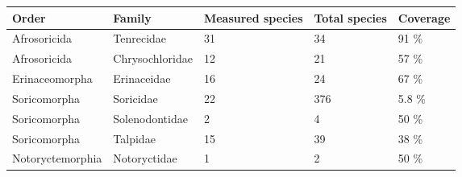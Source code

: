 

\begin{tabular}{p{3.3cm}p{3.3cm}p{2cm}p{2cm}p{2cm}}

\hline
\textbf{Order} & \textbf{Family} & \textbf{Measured species} & \textbf{Total species} & \textbf{Coverage} \\
\hline
Afrosoricida & Tenrecidae & 31 & 34 & 91 \% \\
Afrosoricida & Chrysochloridae & 12 & 21 & 57 \% \\
Erinaceomorpha & Erinaceidae & 16 & 24 & 67 \% \\
Soricomorpha & Soricidae & 22 & 376 & 5.8 \% \\
Soricomorpha & Solenodontidae & 2 & 4 & 50 \% \\
Soricomorpha & Talpidae & 15 & 39 & 38 \% \\
Notoryctemorphia & Notoryctidae & 1 & 2 & 50 \% \\
\hline

\end{tabular}

